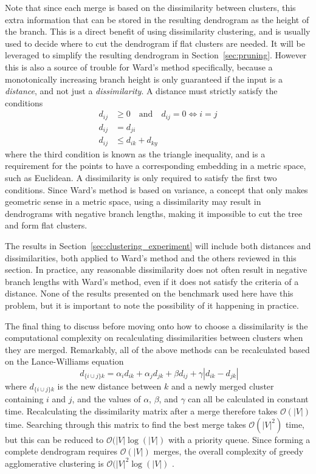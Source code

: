 Note that since each merge is based on the dissimilarity between clusters, this extra information that can be stored in the resulting dendrogram as the height of the branch. This is a direct benefit of using dissimilarity clustering, and is usually used to decide where to cut the dendrogram if flat clusters are needed. It will be leveraged to simplify the resulting dendrogram in Section~\ref{sec:pruning}.
However this is also a source of trouble for Ward's method specifically, because a monotonically increasing branch height is only guaranteed if the input is a \emph{distance}, and not just a \emph{dissimilarity}.
A distance must strictly satisfy the conditions
\begin{equation}
\begin{aligned}
  d_{ij} & \geq 0 \quad\text{and}\quad d_{ij}=0 \Leftrightarrow i=j \\
  d_{ij} & = d_{ji} \\
  d_{ij} & \leq d_{ik} + d_{ky}
\end{aligned}
\end{equation}
where the third condition is known as the triangle inequality, and is a requirement for the points to have a corresponding embedding in a metric space, such as Euclidean.
A dissimilarity is only required to satisfy the first two conditions.
Since Ward's method is based on variance, a concept that only makes geometric sense in a metric space, using a dissimilarity may result in dendrograms with negative branch lengths, making it impossible to cut the tree and form flat clusters.

The results in Section~\ref{sec:clustering_experiment} will include both distances and dissimilarities, both applied to Ward's method and the others reviewed in this section.
In practice, any reasonable dissimilarity does not often result in negative branch lengths with Ward's method, even if it does not satisfy the criteria of a distance. None of the results presented on the benchmark used here have this problem, but it is important to note the possibility of it happening in practice.

The final thing to discuss before moving onto how to choose a dissimilarity is the computational complexity on recalculating dissimilarities between clusters when they are merged. Remarkably, all of the above methods can be recalculated based on the Lance-Williams equation
\begin{equation}
  \;d_{\{i\cup j\}k} = \alpha_i d_{ik} + \alpha_j d_{jk} + \beta d_{ij} + \gamma|d_{ik}-d_{jk}|
  \label{eq:lancewilliams}
\end{equation}
where $d_{\{i\cup j\}k}$ is the new distance between $k$ and a newly merged cluster containing $i$ and $j$, and the values of $\alpha$, $\beta$, and $\gamma$ can all be calculated in constant time.
Recalculating the dissimilarity matrix after a merge therefore takes $\mathcal{O}(|V|)$ time. Searching through this matrix to find the best merge takes $\mathcal{O}(|V|^2)$ time, but this can be reduced to $\mathcal{O}(|V|\log(|V|)$ with a priority queue. Since forming a complete dendrogram requires $\mathcal{O}(|V|)$ merges, the overall complexity of greedy agglomerative clustering is $\mathcal{O}(|V|^2\log(|V|)$ .


